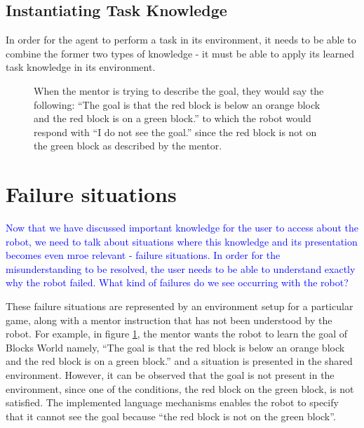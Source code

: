 \documentclass[letterpaper]{article}
\begin{document}
\subsection{Instantiating Task Knowledge}
In order for the agent to perform a task in its environment, it needs to be able to combine the former two types of knowledge - it must be able to apply its learned task knowledge in its environment. 
\begin{figure}
\centering
{}
 \caption{When the mentor is trying to describe the goal, they would say the following: ``The goal is that the red block is below an orange block and the red block is on a green block.'' to which the robot would respond with ``I do not see the goal.'' since the red block is not on the green block as described by the mentor.}
 \label{fig:blocks-goal}
\end{figure}
\section{Failure situations}
\textcolor{blue}{Now that we have discussed important knowledge for the user to access about the robot, we need to talk about situations where this knowledge and its presentation becomes even mroe relevant - failure situations. In order for the misunderstanding to be resolved, the user needs to be able to understand exactly why the robot failed. What kind of failures do we see occurring with the robot?}

These failure situations are represented by an environment setup for a particular game, along with a mentor instruction that has not been understood by the robot. For example, in figure \ref{fig:blocks-goal}, the mentor wants the robot to learn the goal of Blocks World namely, ``The goal is that the red block is below an orange block and the red block is on a green block.'' and a situation is presented in the shared environment. However, it can be observed that the goal is not present in the environment, since one of the conditions, the red block on the green block, is not satisfied. The implemented language mechanisms enables the robot to specify that it cannot see the goal because ``the red block is not on the green block''.
\end{document}
